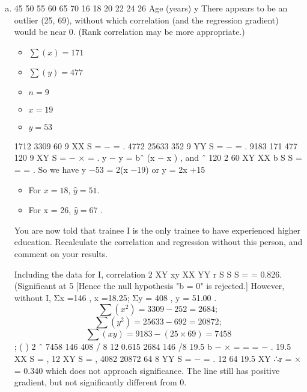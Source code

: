 \documentclass[a4paper,12pt]{article}
\begin{document}
\begin{enumerate}[(a)]
    \item 
45
50
55
60
65
70
16 18 20 22 24 26
Age (years)
y
There appears to be an outlier (25, 69), without which correlation (and the regression
gradient) would be near 0. (Rank correlation may be more appropriate.)
\begin{multicols}{3}
\begin{itemize}
\item $\sum(x) =171$ 
\item $\sum(y) = 477$ 
\item $n = 9$ 
\item $x =19$ 
\item $y = 53$
\end{itemize}
\end{multicols}
1712 3309 60
9 XX S = − = .
4772 25633 352
9 YY S = − = . 9183 171 477 120
9 XY S = − × = .
y − y = bˆ (x − x ) , and ˆ 120 2
60
XY
XX
b S
S
= = = .
So we have y −53 = 2(x −19) or y = 2x +15
\begin{itemize}
\item For $x = 18$, $\hat{y} = 51$. 
\item For x = 26, $\hat{y} = 67$ .
\end{itemize}
\newpage
\begin{framed}

You are now told that trainee I is the only trainee to have experienced higher
education. Recalculate the correlation and regression without this person, and
comment on your results.
\end{framed}


Including the data for I, correlation
2
XY
xy
XX YY
r S
S S
= = 0.826. (Significant at 5%
[Hence the null hypothesis "b = 0" is rejected.]
However, without I, Σx =146 , x =18.25; Σy = 408 , y = 51.00 .
\[\sum(x^2) = 3309 - 252 = 2684 ;\] 
\[\sum(y^2) = 25633- 692 = 20872 ;\]
\[\sum(xy) = 9183- (25 \times 69) = 7458\]; ( )
2
ˆ 7458 146 408 / 8 12 0.615
2684 146 /8 19.5
b
− ×
= = =
−
.
19.5 XX S = , 12 XY S = ,
4082 20872 64
8 YY S = − = .
12
64 19.5 XY ∴r =
×
= 0.340 which does not approach significance. The line still has
positive gradient, but not significantly different from 0.
\end{enumerate}
\end{document}

